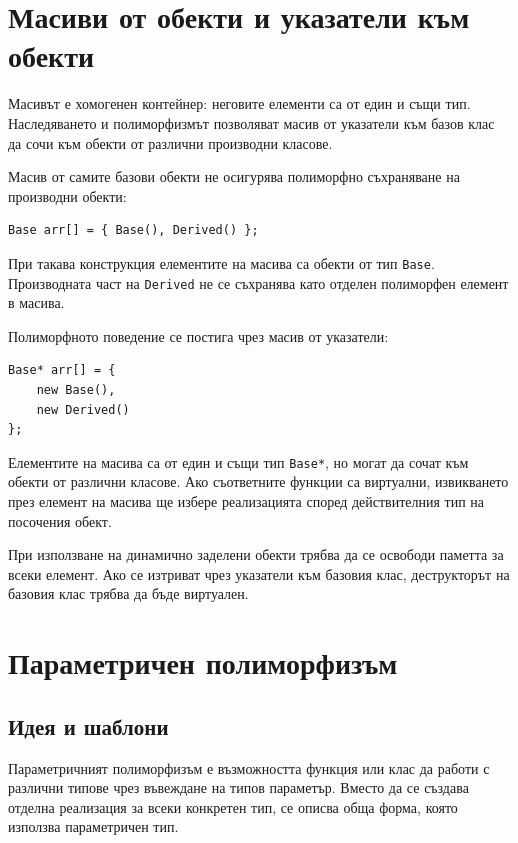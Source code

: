 \section{Масиви от обекти и указатели към обекти}\label{s:17.4}

Масивът е хомогенен контейнер: неговите елементи са от един и същи тип. Наследяването и полиморфизмът позволяват масив от указатели към базов клас да сочи към обекти от различни производни класове.

Масив от самите базови обекти не осигурява полиморфно съхраняване на производни обекти:

\begin{verbatim}
Base arr[] = { Base(), Derived() };
\end{verbatim}

При такава конструкция елементите на масива са обекти от тип \texttt{Base}. Производната част на \texttt{Derived} не се съхранява като отделен полиморфен елемент в масива.

Полиморфното поведение се постига чрез масив от указатели:

\begin{verbatim}
Base* arr[] = {
    new Base(),
    new Derived()
};
\end{verbatim}

Елементите на масива са от един и същи тип \texttt{Base*}, но могат да сочат към обекти от различни класове. Ако съответните функции са виртуални, извикването през елемент на масива ще избере реализацията според действителния тип на посочения обект.

При използване на динамично заделени обекти трябва да се освободи паметта за всеки елемент. Ако се изтриват чрез указатели към базовия клас, деструкторът на базовия клас трябва да бъде виртуален.

\section{Параметричен полиморфизъм}\label{s:17.5}

\subsection{Идея и шаблони}\label{s:17.5.1}

Параметричният полиморфизъм е възможността функция или клас да работи с различни типове чрез въвеждане на типов параметър. Вместо да се създава отделна реализация за всеки конкретен тип, се описва обща форма, която използва параметричен тип.

